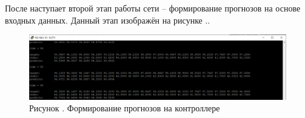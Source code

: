 {	\par \redline После наступает второй этап работы сети {--} формирование прогнозов на основе входных данных. Данный этап изображён на рисунке \thechaptercntr .\theimagecntr. 

	\begin{figure}[H]
		\centering
		\def\svgwidth{\textwidth}
		\includegraphics[width=\textwidth]{images/ResultsPredicts.png}
		\caption*{\gostFont Рисунок \thechaptercntr .\theimagecntr \spc {--} Формирование прогнозов на контроллере}
		\label{fig:ResultsPredicts}
	  \end{figure} \addtocounter{imagecntr}{1}

	\par
}

\setcounter{subchaptercntr}{1}
\setcounter{formulacntr}{1}
\setcounter{imagecntr}{1}
\setcounter{tablecntr}{1}
\setcounter{itemcntr}{1}

